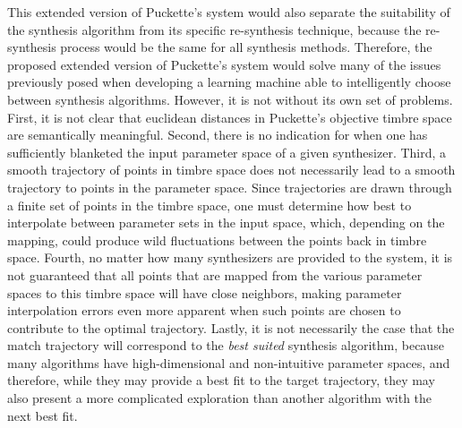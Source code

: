 \documentclass[12pt]{report} 	%
\numberwithin{figure}{chapter}
\numberwithin{table}{chapter}
\numberwithin{equation}{chapter}
\begin{document}
\begin{flushleft}
This extended version of Puckette's system would also separate the suitability of the synthesis algorithm from its specific re-synthesis technique, because the re-synthesis process would be the same for all synthesis methods. Therefore, the proposed extended version of Puckette's system would solve many of the issues previously posed when developing a learning machine able to intelligently choose between synthesis algorithms. However, it is not without its own set of problems. First, it is not clear that euclidean distances in Puckette's objective timbre space are semantically meaningful. Second, there is no indication for when one has sufficiently blanketed the input parameter space of a given synthesizer. Third, a smooth trajectory of points in timbre space does not necessarily lead to a smooth trajectory to points in the parameter space. Since trajectories are drawn through a finite set of points in the timbre space, one must determine how best to interpolate between parameter sets in the input space, which, depending on the mapping, could produce wild fluctuations between the points back in timbre space. Fourth, no matter how many synthesizers are provided to the system, it is not guaranteed that all points that are mapped from the various parameter spaces to this timbre space will have close neighbors, making parameter interpolation errors even more apparent when such points are chosen to contribute to the optimal trajectory. Lastly, it is not necessarily the case that the match trajectory will correspond to the \textit{best suited} synthesis algorithm, because many algorithms have high-dimensional and non-intuitive parameter spaces, and therefore, while they may provide a best fit to the target trajectory, they may also present a more complicated exploration than another algorithm with the next best fit.


\end{flushleft}
\end{document}

